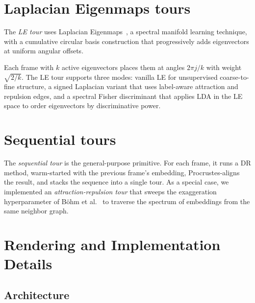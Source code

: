 \documentclass[11pt]{article}
\begin{document}
\section{Laplacian Eigenmaps tours}

The \emph{LE tour} uses Laplacian Eigenmaps~\cite{Belkin2003-ea}, a spectral manifold learning technique, with a cumulative circular basis construction that progressively adds eigenvectors at uniform angular offsets.

Each frame with $k$ active eigenvectors places them at angles $2\pi j/k$ with weight $\sqrt{2/k}$. The LE tour supports three modes: vanilla LE for unsupervised coarse-to-fine structure, a signed Laplacian variant that uses label-aware attraction and repulsion edges, and a spectral Fisher discriminant that applies LDA in the LE space to order eigenvectors by discriminative power.

\section{Sequential tours}

The \emph{sequential tour} is the general-purpose primitive. For each frame, it runs a DR method,
warm-started with the previous frame's embedding, Procrustes-aligns the result, and stacks the sequence into a single tour. As a special case, we implemented an \emph{attraction-repulsion tour} that sweeps the exaggeration hyperparameter of Böhm et al.~\cite{boehm2022attraction} to traverse the spectrum of embeddings from the same neighbor graph.

\section{Rendering and Implementation Details}
\label{sec:implementation}

\subsection{Architecture}
\end{document}
